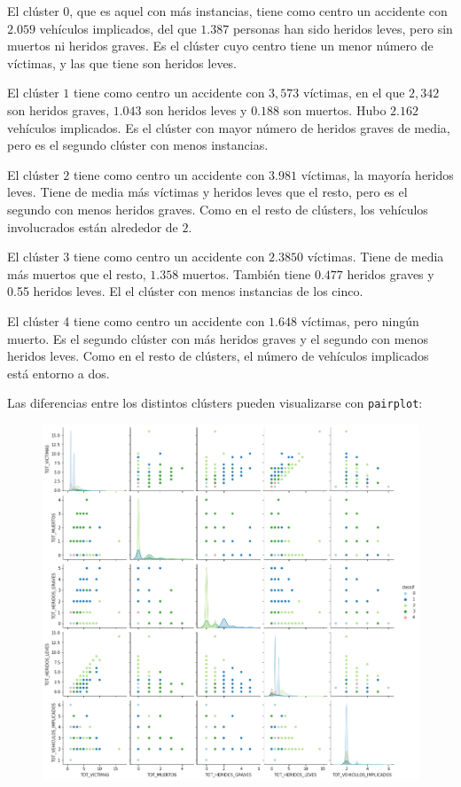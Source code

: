 \documentclass[a4]{article}
\begin{document}
El clúster $0$, que es aquel con más instancias, tiene como centro un accidente con $2.059$ vehículos implicados, del que $1.387$ personas han sido heridos leves, pero sin muertos ni heridos graves. Es el clúster cuyo centro tiene un menor número de víctimas, y las que tiene son heridos leves.

El clúster $1$ tiene como centro un accidente con $3,573$ víctimas, en el que $2,342$ son heridos graves, $1.043$ son heridos leves y $0.188$ son muertos. Hubo $2.162$ vehículos implicados. Es el clúster con mayor número de heridos graves de media, pero es el segundo clúster con menos instancias.

El clúster $2$ tiene como centro un accidente con $3.981$ víctimas, la mayoría heridos leves. Tiene de media más víctimas y heridos leves que el resto, pero es el segundo con menos heridos graves. Como en el resto de clústers, los vehículos involucrados están alrededor de $2$.

El clúster $3$ tiene como centro un accidente con $2.3850$ víctimas. Tiene de media más muertos que el resto, $1.358$ muertos. También tiene $0.477$ heridos graves y 0.55 heridos leves. El el clúster con menos instancias de los cinco.

El clúster 4 tiene como centro un accidente con $1.648$ víctimas, pero ningún muerto. Es el segundo clúster con más heridos graves y el segundo con menos heridos leves. Como en el resto de clústers, el número de vehículos implicados está entorno a dos.

Las diferencias entre los distintos clústers pueden visualizarse con \texttt{pairplot}:

\begin{figure}[H]
  \centering
  \includegraphics[width=166mm]{imagenes/c1_kmeans_pairplot}
\end{figure}
\end{document}
